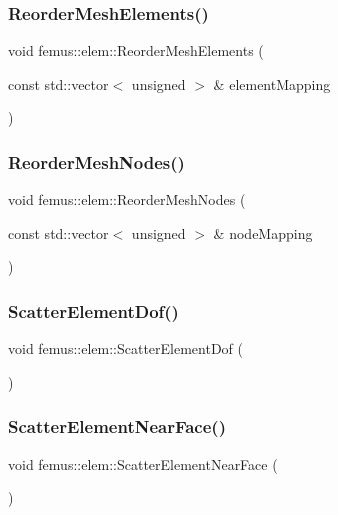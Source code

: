 \subsubsection{\texorpdfstring{Reorder\+Mesh\+Elements()}{ReorderMeshElements()}}
{\footnotesize\ttfamily void femus\+::elem\+::\+Reorder\+Mesh\+Elements (\begin{DoxyParamCaption}\item[{const std\+::vector$<$ unsigned $>$ \&}]{element\+Mapping }\end{DoxyParamCaption})}

\mbox{\label{classfemus_1_1elem_a144e44d4d378fc7daea1e6bfd2aa4ac4}} 
\subsubsection{\texorpdfstring{Reorder\+Mesh\+Nodes()}{ReorderMeshNodes()}}
{\footnotesize\ttfamily void femus\+::elem\+::\+Reorder\+Mesh\+Nodes (\begin{DoxyParamCaption}\item[{const std\+::vector$<$ unsigned $>$ \&}]{node\+Mapping }\end{DoxyParamCaption})}

\mbox{\label{classfemus_1_1elem_af48747556a201848ae9a213cd472070a}} 
\subsubsection{\texorpdfstring{Scatter\+Element\+Dof()}{ScatterElementDof()}}
{\footnotesize\ttfamily void femus\+::elem\+::\+Scatter\+Element\+Dof (\begin{DoxyParamCaption}{ }\end{DoxyParamCaption})}

\mbox{\label{classfemus_1_1elem_a1fbaf0f106a278950775a386ef0a7f55}} 
\subsubsection{\texorpdfstring{Scatter\+Element\+Near\+Face()}{ScatterElementNearFace()}}
{\footnotesize\ttfamily void femus\+::elem\+::\+Scatter\+Element\+Near\+Face (\begin{DoxyParamCaption}{ }\end{DoxyParamCaption})}

